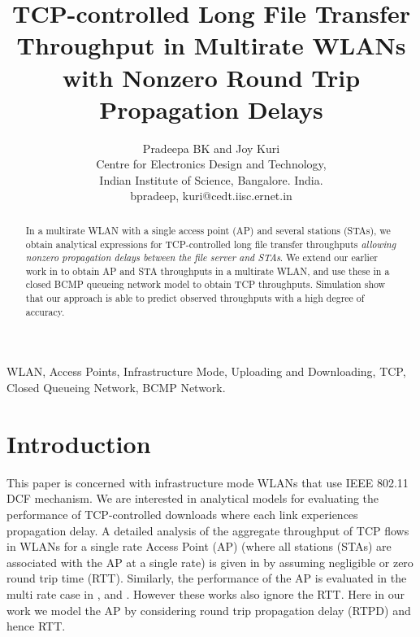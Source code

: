 \documentclass[conference]{IEEEtran}
\begin{document}
\title{ TCP-controlled Long File Transfer Throughput in Multirate 
WLANs with Nonzero Round Trip Propagation Delays }
\author{Pradeepa BK and Joy Kuri \\ 
Centre for Electronics Design and Technology, \\
Indian Institute of Science, Bangalore. India. \\
{bpradeep, kuri}@cedt.iisc.ernet.in
}
\markboth{}
{ \MakeLowercase{}}
\maketitle
\begin{abstract}
In a multirate WLAN with a single access point (AP) and several stations
 (STAs), we obtain analytical expressions for TCP-controlled long file 
 transfer throughputs \emph{allowing nonzero propagation delays between 
 the file server and STAs}. We extend our earlier work in 
 \cite{astn_model:pradeep_kuri} to obtain AP and STA throughputs in a 
 multirate WLAN, and use these in a closed BCMP queueing network model 
 to obtain TCP throughputs. Simulation show that our approach is able 
 to predict observed throughputs with a high degree of accuracy. 
\end{abstract}
\begin{IEEEkeywords}
WLAN, Access Points, Infrastructure Mode, Uploading and Downloading, TCP, Closed Queueing Network, BCMP Network.
\end{IEEEkeywords}
\IEEEpeerreviewmaketitle
\section{Introduction}\label{sec:Introduction}
This paper is concerned with infrastructure mode WLANs that use IEEE 802.11 
DCF mechanism. We are interested in analytical models 
for evaluating  the performance of TCP-controlled downloads where
each link experiences propagation delay. 
A detailed analysis of the aggregate throughput of TCP flows in WLANs
for a single rate Access Point (AP) (where all stations (STAs) are associated with the AP
at a single rate) is given in \cite{astn_model:Kuriakose} by assuming 
negligible or zero round trip time (RTT).
Similarly, the performance of the AP is evaluated in the multi rate case in 
\cite{astn_model:Krusheel}, \cite{astn_model:pradeep_kuri} and 
\cite{astn_model:pradeep_kuri2}. 
However these works also ignore the RTT. Here in our work we model the AP by 
considering round trip propagation delay (RTPD) and hence RTT.
\end{document}
